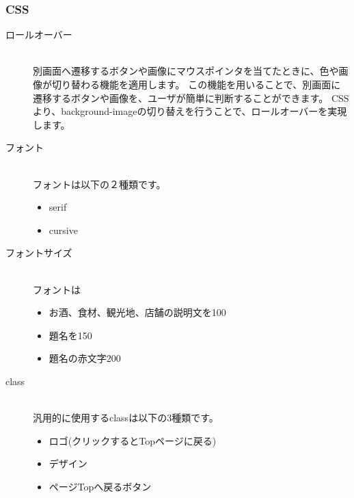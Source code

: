 \documentclass[a4j,titlepage]{jarticle}
\begin{document}
\subsubsection{CSS}
\begin{description}
\item[ロールオーバー]~\\
別画面へ遷移するボタンや画像にマウスポインタを当てたときに、色や画像が切り替わる機能を適用します。
この機能を用いることで、別画面に遷移するボタンや画像を、ユーザが簡単に判断することができます。
CSSより、background-imageの切り替えを行うことで、ロールオーバーを実現します。

\item [フォント]~\\
フォントは以下の２種類です。

\begin{itemize}
\item serif
\item cursive
\end{itemize}

\item [フォントサイズ]~\\
フォントは%

\begin{itemize}
\item お酒、食材、観光地、店舗の説明文を100%
\item 題名を150%
\item 題名の赤文字200%
\end{itemize}


\item [class]~\\
汎用的に使用するclassは以下の3種類です。

\begin{itemize}
\item ロゴ(クリックするとTopページに戻る)
\item デザイン
\item ページTopへ戻るボタン
\end{itemize}

\end{description}
\end{document}
